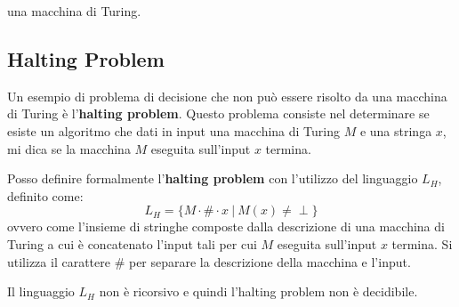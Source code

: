 una macchina di Turing.
\subsection{Halting Problem}
Un esempio di problema di decisione che non può essere risolto da una macchina
di Turing è l'\textbf{halting problem}. Questo problema consiste nel determinare
se esiste un algoritmo che dati in input una macchina di Turing $M$ e una stringa
$x$, mi dica se la macchina $M$ eseguita sull'input $x$ termina.

\begin{definizione}
    Posso definire formalmente l'\textbf{halting problem} con l'utilizzo del
    linguaggio $L_H$, definito come:
    \begin{equation}
        L_H = \{M \cdot \# \cdot x \ | \ M(x) \neq \perp \}
    \end{equation}
    ovvero come l'insieme di stringhe composte dalla descrizione di una macchina
    di Turing a cui è concatenato l'input tali per cui $M$ eseguita sull'input
    $x$ termina. Si utilizza il carattere $\#$ per separare la descrizione della
    macchina e l'input.
\end{definizione}
\begin{teorema}
    Il linguaggio $L_H$ non è ricorsivo e quindi l'halting problem non è
    decidibile.
\end{teorema}
